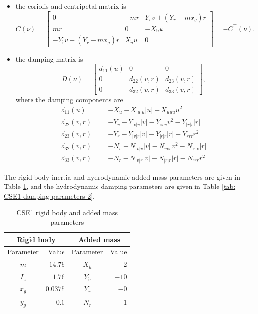 \begin{itemize}
	\item the coriolis and centripetal matrix is
	\[
	C\left(\nu\right)=\left[\begin{array}{ccc}
	0 & -mr & Y_{\dot{v}}v+\left(Y_{\dot{r}}-mx_{g}\right)r\\
	mr & 0 & -X_{\dot{u}}u\\
	-Y_{\dot{v}}v-\left(Y_{\dot{r}}-mx_{g}\right)r & X_{\dot{u}}u & 0
	\end{array}\right]=-C^{\top}\left(\nu\right).
	\]
	\item the damping matrix is
	\[
	D\left(\nu\right)=\left[\begin{array}{ccc}
	d_{11}\left(u\right) & 0 & 0\\
	0 & d_{22}\left(v,r\right) & d_{23}\left(v,r\right)\\
	0 & d_{32}\left(v,r\right) & d_{33}\left(v,r\right)
	\end{array}\right],
	\]
	where the damping components are 
	\begin{eqnarray}
	d_{11}\left(u\right) & = & -X_{u}-X_{\left\vert u\right\vert u}\left\vert u\right\vert -X_{uuu}u^{2}\label{Eq:d11}\\
	d_{22}\left(v,r\right) & = & -Y_{v}-Y_{\left\vert v\right\vert v}\left\vert v\right\vert -Y_{vvv}v^{2}-Y_{\left\vert r\right\vert v}\left\vert r\right\vert \label{Eq:d22}\\
	d_{23}\left(v,r\right) & = & -Y_{r}-Y_{\left\vert v\right\vert r}\left\vert v\right\vert -Y_{\left\vert r\right\vert r}\left\vert r\right\vert -Y_{rrr}r^{2}\label{Eq:d23}\\
	d_{32}\left(v,r\right) & = & -N_{v}-N_{\left\vert v\right\vert v}\left\vert v\right\vert -N_{vvv}v^{2}-N_{\left\vert r\right\vert v}\left\vert r\right\vert \label{Eq:d32}\\
	d_{33}\left(v,r\right) & = & -N_{r}-N_{\left\vert v\right\vert r}\left\vert v\right\vert -N_{\left\vert r\right\vert r}\left\vert r\right\vert -N_{rrr}r^{2}\label{Eq:d33}
	\end{eqnarray}
\end{itemize}
The rigid body inertia and hydrodynamic added mass parameters are given in Table \ref{tab: CSE1-rigid-body}, and the hydrodynamic damping parameters are given in Table \ref{tab: CSE1 damping parameters 2}.
\begin{table}[h!]
	\begin{centering}
		\begin{tabular}{crcr}
			\multicolumn{2}{c}{Rigid body} & \multicolumn{2}{c}{Added mass}\tabularnewline
			\midrule 
			Parameter & Value & Parameter & Value\tabularnewline
			\midrule 
			$m$  & $14.79$  & $X_{\dot{u}}$  & $-2$ \tabularnewline
			$I_{z}$  & $1.76$  & $Y_{\dot{v}}$  & $-10$ \tabularnewline
			$x_{g}$  & $0.0375$  & $Y_{\dot{r}}$  & $-0$ \tabularnewline
			$y_{g}$  & $0.0$  & $N_{\dot{r}}$  & $-1$ \tabularnewline
			\bottomrule
		\end{tabular}
		\par\end{centering}
	\caption{CSE1 rigid body and added mass parameters}
	\label{tab: CSE1-rigid-body}
\end{table}

